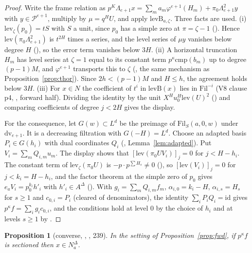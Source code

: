 \documentclass[11pt]{article}
\newcommand{\NN}{N^{\Delta}}
\newcommand{\Pp}{\mathcal P}
\newcommand{\Fil}{\mathrm{Fil}}
\newtheorem{prop}[lemma]{Proposition}
\theoremstyle{definition}
\theoremstyle{remark}
\begin{document}
\begin{proof}
Write the frame relation as $p^{K}\Lambda_{e+1}x=\sum_ma_m\varphi^{e+1}(H_m)+\pi_0\Lambda_{e+1}^2y$ with $y\in\Pp^{e+1}$, multiply by $\mu=q^HU$, and apply $\mathrm{levB}_{a,\zeta}$. Three facts are used. (i) $\mathrm{lev}_\zeta(p_0)=tS$ with $S$ a unit, since $p_0$ has a simple zero at $\pi=\zeta-1$ (). Hence $\mathrm{lev}(\pi_0\Lambda_{e+1}^2)$ is $t^{2H}$ times a series, and the level series of $\mu y$ vanishes below degree $H$ (), so the error term vanishes below $3H$. (ii) A horizontal truncation $H_m$ has level series at $\zeta=1$ equal to its constant term $p^\kappa\mathrm{cmp}(b_m)$ up to degree $(p-1)M$, and $\varphi^{e+1}$ transports this to $\zeta$ (, the same mechanism as Proposition~\ref{prop:thor}). Since $2h<(p-1)M$ and $H\le h$, the agreement holds below $3H$. (iii) For $x\in N$ the coefficient of $t^i$ in $\mathrm{levB}(x)$ lies in $\Fil^{-i}$ (V8 clause p4, , forward half). Dividing the identity by the unit $X^Hu_0^H\mathrm{lev}(U)^2$ () and comparing coefficients of degree $j<2H$ gives the display.

For the consequence, let $G(w)\subset L^d$ be the preimage of $\Fil_S(a,0,w)$ under $\mathrm{dv}_{e+1}$. It is a decreasing filtration with $G(-H)=L^d$. Choose an adapted basis $P_i\in G(h_i)$ with dual coordinates $Q_i$ (, Lemma~\ref{lem:adapted}). Put $V_i=\sum_mQ_{i,m}u_m$. The display shows that $[\mathrm{lev}(\pi_0UV_i)]_j=0$ for $j<H-h_i$. The constant term of $\mathrm{lev}_\zeta(\pi_0U)$ is $-p\cdot p^{\sum H_s}\ne0$ (), so $[\mathrm{lev}(V_i)]_j=0$ for $j<k_i=H-h_i$, and the factor theorem at the simple zero of $p_0$ gives $e_aV_i=p_0^{k_i}h'_i$ with $h'_i\in A^\Delta$ (). With $g_i=\sum_mQ_{i,m}f_m$, $\alpha_{i,0}=k_i-H$, $\alpha_{i,s}=H_s$ for $s\ge1$ and $c_{0,i}=P_i$ (cleared of denominators), the identity $\sum_iP_iQ_i=\mathrm{id}$ gives $p^{\kappa}f=\sum_ig_ic_{0,i}$, and the conditions hold at level $0$ by the choice of $h_i$ and at levels $s\ge1$ by .
\end{proof}

\begin{prop}[converse, , , 239]\label{prop:conv}
In the setting of Proposition~\ref{prop:fwd}, if $p^\kappa f$ is sectioned then $x\in\NN_a$.
\end{prop}
\end{document}
